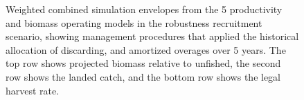 \documentclass[11pt]{book}
\begin{document}
\begin{landscape}
\begin{figure}[htb]
{\centering {} 

}

\caption{Weighted combined simulation envelopes from the 5 productivity and biomass operating models in the robustness recruitment scenario, showing management procedures that applied the historical allocation of discarding, and amortized overages over 5 years. The top row shows projected biomass relative to unfished, the second row shows the landed catch, and the bottom row shows the legal harvest rate.}\label{fig:unnamed-chunk-23}
\end{figure}
\end{landscape}
\MakeAvailable
\end{document}

